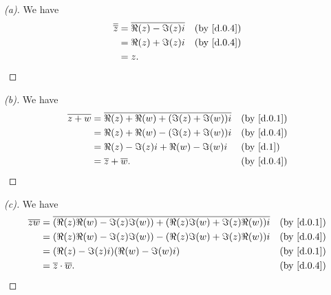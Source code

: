 \begin{proof}[(a)]
	We have
	\begin{align*}
		\conj{\conj{z}} & = \conj{\Re(z) - \Im(z) i} &  & \by{d.0.4} \\
		                & = \Re(z) + \Im(z) i        &  & \by{d.0.4} \\
		                & = z.
	\end{align*}
\end{proof}

\begin{proof}[(b)]
	We have
	\begin{align*}
		\conj{z + w} & = \conj{\Re(z) + \Re(w) + (\Im(z) + \Im(w)) i} &  & \by{d.0.1} \\
		             & = \Re(z) + \Re(w) - (\Im(z) + \Im(w)) i        &  & \by{d.0.4} \\
		             & = \Re(z) - \Im(z) i + \Re(w) - \Im(w) i        &  & \by{d.1}   \\
		             & = \conj{z} + \conj{w}.                         &  & \by{d.0.4}
	\end{align*}
\end{proof}

\begin{proof}[(c)]
	We have
	\begin{align*}
		\conj{zw} & = \conj{(\Re(z) \Re(w) - \Im(z) \Im(w)) + (\Re(z) \Im(w) + \Im(z) \Re(w)) i} &  & \by{d.0.1} \\
		          & = (\Re(z) \Re(w) - \Im(z) \Im(w)) - (\Re(z) \Im(w) + \Im(z) \Re(w)) i        &  & \by{d.0.4} \\
		          & = (\Re(z) - \Im(z) i) (\Re(w) - \Im(w) i)                                    &  & \by{d.0.1} \\
		          & = \conj{z} \cdot \conj{w}.                                                   &  & \by{d.0.4}
	\end{align*}
\end{proof}


